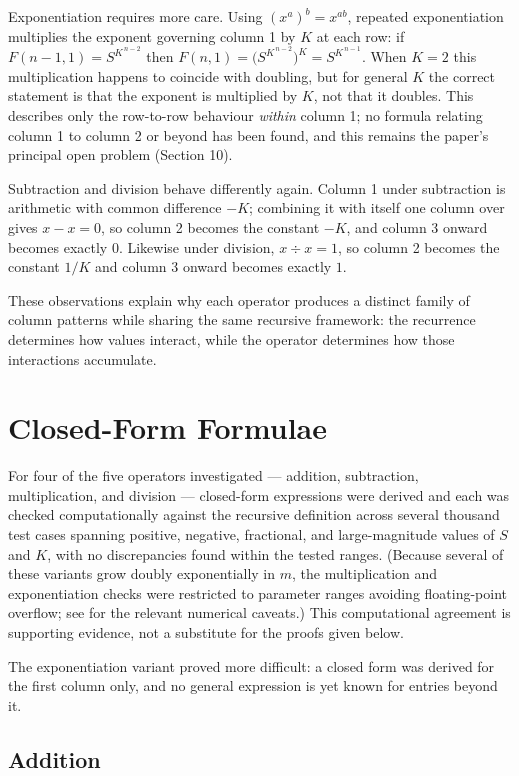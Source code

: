 \documentclass[11pt]{article}
\theoremstyle{definition}
\begin{document}
Exponentiation requires more care. Using $(x^a)^b = x^{ab}$, repeated exponentiation multiplies the exponent governing column 1 by $K$ at each row: if $F(n-1,1) = S^{K^{\,n-2}}$ then $F(n,1) = \bigl(S^{K^{\,n-2}}\bigr)^{K} = S^{K^{\,n-1}}$. When $K=2$ this multiplication happens to coincide with doubling, but for general $K$ the correct statement is that the exponent is multiplied by $K$, not that it doubles. This describes only the row-to-row behaviour \emph{within} column 1; no formula relating column 1 to column 2 or beyond has been found, and this remains the paper's principal open problem (Section 10).

Subtraction and division behave differently again. Column 1 under subtraction is arithmetic with common difference $-K$; combining it with itself one column over gives $x-x=0$, so column 2 becomes the constant $-K$, and column 3 onward becomes exactly $0$. Likewise under division, $x \div x = 1$, so column 2 becomes the constant $1/K$ and column 3 onward becomes exactly $1$.

These observations explain why each operator produces a distinct family of column patterns while sharing the same recursive framework: the recurrence determines how values interact, while the operator determines how those interactions accumulate.

\section{Closed-Form Formulae}

For four of the five operators investigated --- addition, subtraction, multiplication, and division --- closed-form expressions were derived and each was checked computationally against the recursive definition across several thousand test cases spanning positive, negative, fractional, and large-magnitude values of $S$ and $K$, with no discrepancies found within the tested ranges. (Because several of these variants grow doubly exponentially in $m$, the multiplication and exponentiation checks were restricted to parameter ranges avoiding floating-point overflow; see \cite{goldberg1991} for the relevant numerical caveats.) This computational agreement is supporting evidence, not a substitute for the proofs given below.

The exponentiation variant proved more difficult: a closed form was derived for the first column only, and no general expression is yet known for entries beyond it.

\subsection{Addition}
\end{document}
